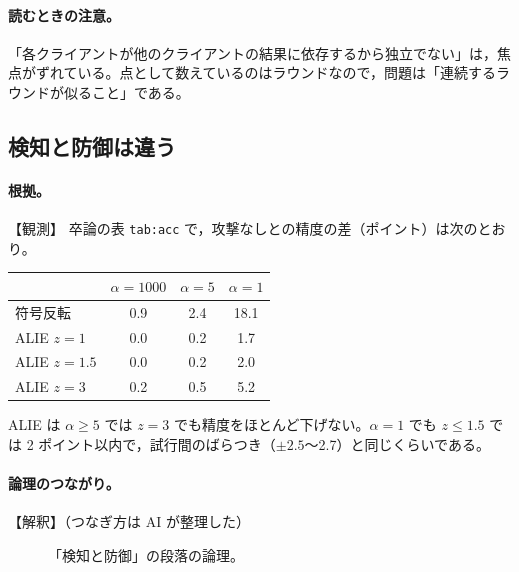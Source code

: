 \documentclass[a4j, dvipdfmx]{jsarticle}  %
\begin{document}
\paragraph{読むときの注意。}
「各クライアントが他のクライアントの結果に依存するから独立でない」は，焦点がずれている。点として数えているのはラウンドなので，問題は「連続するラウンドが似ること」である。

\subsection{検知と防御は違う}
\label{sec:claim-threats-defense}

\paragraph{根拠。}【観測】
卒論の表 \texttt{tab:acc} で，攻撃なしとの精度の差（ポイント）は次のとおり。
\begin{center}
\small
\begin{tabular}{@{}lccc@{}}
\toprule
 & $\alpha = 1000$ & $\alpha = 5$ & $\alpha = 1$ \\
\midrule
符号反転 & 0.9 & 2.4 & 18.1 \\
ALIE $z = 1$ & 0.0 & 0.2 & 1.7 \\
ALIE $z = 1.5$ & 0.0 & 0.2 & 2.0 \\
ALIE $z = 3$ & 0.2 & 0.5 & 5.2 \\
\bottomrule
\end{tabular}
\end{center}
ALIE は $\alpha \ge 5$ では $z = 3$ でも精度をほとんど下げない。$\alpha = 1$ でも $z \le 1.5$ では 2 ポイント以内で，試行間のばらつき（$\pm 2.5$〜2.7）と同じくらいである。

\paragraph{論理のつながり。}【解釈】（つなぎ方は AI が整理した）
\begin{figure}[H]
\centering
{}
\caption{「検知と防御」の段落の論理。}
\label{fig:threats-defense}
\end{figure}
\end{document}
